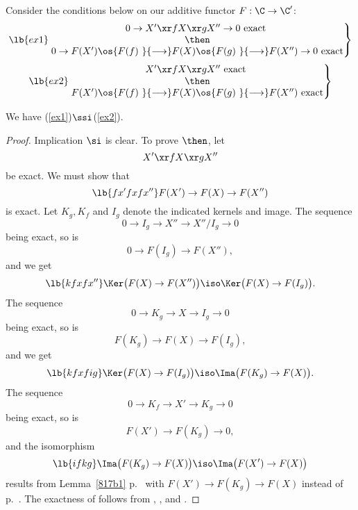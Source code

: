 \documentclass[12pt]{article}
\theoremstyle{remark}
\theoremstyle{definition}
\begin{document}
Consider the conditions below on our additive functor $F:\C\to\C'$:
%
\begin{equation}\lb{ex1}
\left.
\begin{matrix}
0\to X'\xr fX\xr gX''\to0\text{ exact }\\ 
\then\\ 
0\to F(X')\os{F(f)\ }{\longrightarrow}F(X)\os{F(g)\ }{\longrightarrow}F(X'')\to0\text{ exact}
\end{matrix}
\right\}
\end{equation}
%
\begin{equation}\lb{ex2}
\left.
\begin{matrix}
X'\xr fX\xr gX''\text{ exact }\\ 
\then\\ 
F(X')\os{F(f)\ }{\longrightarrow}F(X)\os{F(g)\ }{\longrightarrow}F(X'')\text{ exact}
\end{matrix}
\right\}
\end{equation}

\begin{lem}
We have (\ref{ex1})$\ssi$(\ref{ex2}).
\end{lem}

\begin{proof}
Implication $\si$ is clear. To prove $\then$, let 
$$
X'\xr fX\xr gX''
$$
be exact. We must show that 
%
\begin{equation}\lb{fx'fxfx''}
F(X')\to F(X)\to F(X'')
\end{equation} 
% 
is exact. Let $K_g,K_f$ and $I_g$ denote the indicated kernels and image. The sequence 
$$ 
0\to I_g\to X''\to X''/I_g\to 0
$$ 
being exact, so is 
$$ 
0\to F(I_g)\to F(X''), 
$$ 
and we get 
%
\begin{equation}\lb{kfxfx''}
\Ker\big(F(X)\to F(X'')\big)\iso\Ker\big(F(X)\to F(I_g)\big). 
\end{equation} 
% 
The sequence 
$$ 
0\to K_g\to X\to I_g\to 0
$$ 
being exact, so is 
$$ 
F(K_g)\to F(X)\to F(I_g), 
$$ 
and we get 
%
\begin{equation}\lb{kfxfig}
\Ker\big(F(X)\to F(I_g)\big)\iso\Ima\big(F(K_g)\to F(X)\big). 
\end{equation} 
% 
The sequence 
$$ 
0\to K_f\to X'\to K_g\to 0 
$$ 
being exact, so is 
$$ 
F(X')\to F(K_g)\to0,  
$$ 
and the isomorphism 
%
\begin{equation}\lb{ifkg}
\Ima\big(F(K_g)\to F(X)\big)\iso\Ima\big(F(X')\to F(X)\big)  
\end{equation} 
% 
results from Lemma~\ref{817b1} p.~ with $F(X')\to F(K_g)\to F(X)$ instead of  p.~. The exactness of  follows from , , and .
\end{proof} 
\end{document}
